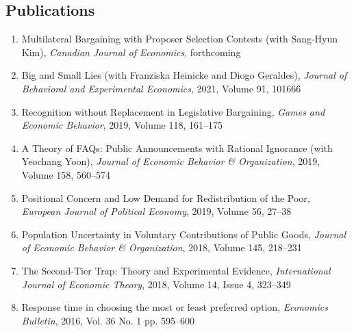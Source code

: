 \documentclass[margin, letterpaper]{res}
\begin{document}
\begin{resume}
\section{Publications}
\begin{enumerate}
\item Multilateral Bargaining with Proposer Selection Contests (with Sang-Hyun Kim), \emph{Canadian Journal of Economics}, forthcoming
\item Big and Small Lies (with Franziska Heinicke and Diogo Geraldes), \emph{Journal of Behavioral and Experimental Economics}, 2021, Volume 91, 101666
\item Recognition without Replacement in Legislative Bargaining, \emph{Games and Economic Behavior}, 2019, Volume 118, 161--175
\item A Theory of FAQs: Public Announcements with Rational Ignorance (with Yeochang Yoon), \emph{Journal of Economic Behavior \& Organization}, 2019, Volume 158, 560--574
\item Positional Concern and Low Demand for Redistribution of the Poor, \emph{European Journal of Political Economy}, 2019, Volume 56, 27--38
\item Population Uncertainty in Voluntary Contributions of Public Goods, \emph{Journal of Economic Behavior \& Organization}, 2018, Volume 145, 218--231
\item The Second-Tier Trap: Theory and Experimental Evidence, \emph{International Journal of Economic Theory}, 2018, Volume 14, Issue 4, 323--349
\item Response time in choosing the most or least preferred option, \textit{Economics Bulletin}, 2016, Vol. 36 No. 1 pp. 595--600
\end{enumerate}


\end{resume}
\end{document}
